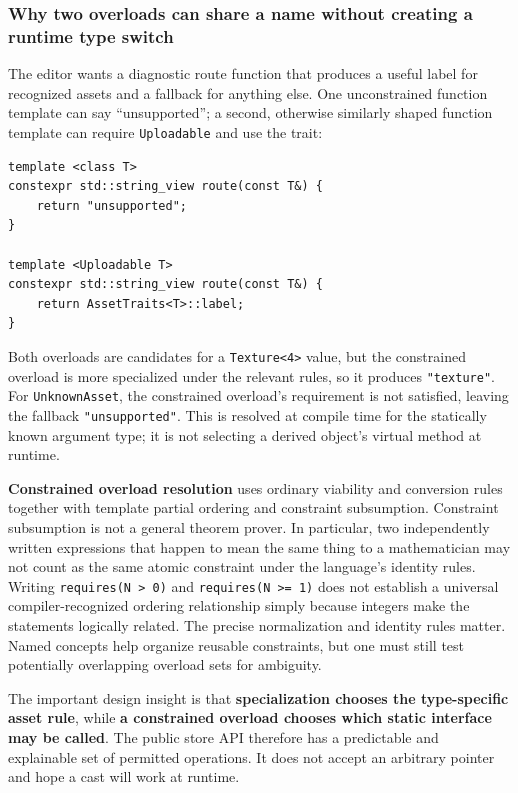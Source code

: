 \subsubsection{Why two overloads can share a name without creating a runtime type switch}\label{why-two-overloads-can-share-a-name-without-creating-a-runtime-type-switch}

The editor wants a diagnostic route function that produces a useful label for recognized assets and a fallback for anything else. One unconstrained function template can say ``unsupported''; a second, otherwise similarly shaped function template can require \texttt{Uploadable} and use the trait:

\begin{verbatim}
template <class T>
constexpr std::string_view route(const T&) {
    return "unsupported";
}

template <Uploadable T>
constexpr std::string_view route(const T&) {
    return AssetTraits<T>::label;
}
\end{verbatim}

Both overloads are candidates for a \texttt{Texture\textless{}4\textgreater{}} value, but the constrained overload is more specialized under the relevant rules, so it produces \texttt{"texture"}. For \texttt{UnknownAsset}, the constrained overload's requirement is not satisfied, leaving the fallback \texttt{"unsupported"}. This is resolved at compile time for the statically known argument type; it is not selecting a derived object's virtual method at runtime.

\textbf{Constrained overload resolution} uses ordinary viability and conversion rules together with template partial ordering and constraint subsumption. Constraint subsumption is not a general theorem prover. In particular, two independently written expressions that happen to mean the same thing to a mathematician may not count as the same atomic constraint under the language's identity rules. Writing \texttt{requires(N\ \textgreater{}\ 0)} and \texttt{requires(N\ \textgreater{}=\ 1)} does not establish a universal compiler-recognized ordering relationship simply because integers make the statements logically related. The precise normalization and identity rules matter. Named concepts help organize reusable constraints, but one must still test potentially overlapping overload sets for ambiguity.

The important design insight is that \textbf{specialization chooses the type-specific asset rule}, while \textbf{a constrained overload chooses which static interface may be called}. The public store API therefore has a predictable and explainable set of permitted operations. It does not accept an arbitrary pointer and hope a cast will work at runtime.

